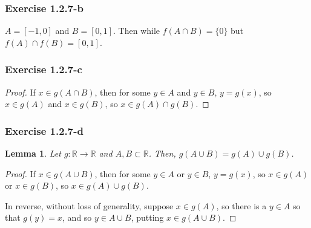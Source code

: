\documentclass{article}
\newcommand{\R}{\mathbb{R}}
\newtheorem*{lemma}{Lemma}
\begin{document}
\subsubsection*{Exercise 1.2.7-b}

$A = [-1, 0]$ and $B = [0, 1]$. Then while $f(A \cap B) = \{0\}$ but $f(A) \cap f(B) = [0, 1]$.

\subsubsection*{Exercise 1.2.7-c}

\begin{proof}
If $x \in g(A \cap B)$, then for some $y \in A$ and $y \in B$, $y = g(x)$, so $x \in g(A)$ and $x \in g(B)$, so $x \in g(A) \cap g(B)$.
\end{proof}

\subsubsection*{Exercise 1.2.7-d}

\begin{lemma}
Let $g: \R \to \R$ and $A, B \subset \R$. Then, $g(A \cup B) = g(A) \cup g(B)$.
\end{lemma}

\begin{proof}
If $x \in g(A \cup B)$, then for some $y \in A$ or $y \in B$, $y = g(x)$, so $x \in g(A)$ or $x \in g(B)$, so $x \in g(A) \cup g(B)$.

In reverse, without loss of generality, suppose $x \in g(A)$, so there is a $y \in A$ so that $g(y) = x$, and so $y \in A \cup B$, putting $x \in g(A \cup B)$.
\end{proof}
\end{document}
